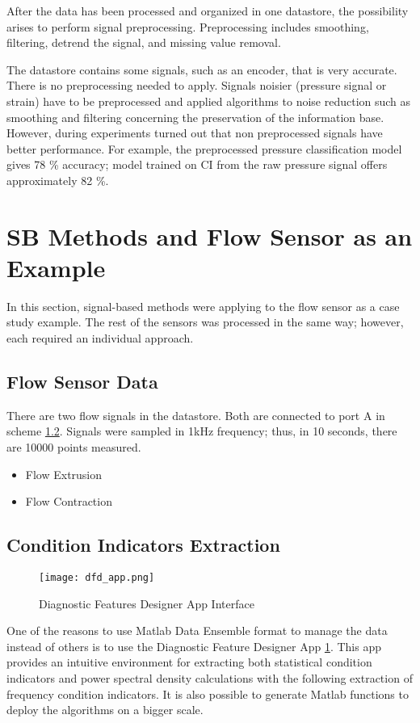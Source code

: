 After the data has been processed and organized in one datastore, the
possibility arises to perform signal preprocessing.  Preprocessing includes
smoothing, filtering, detrend the signal, and missing value removal.

The datastore contains some signals, such as an encoder, that is very
accurate. There is no preprocessing needed to apply. Signals noisier
(pressure signal or strain) have to be preprocessed and applied algorithms
to noise reduction such as smoothing and filtering concerning the
preservation of the information base. However, during experiments turned
out that non preprocessed signals have better performance. For example, the
preprocessed pressure classification model gives 78 \% accuracy; model
trained on CI from the raw pressure signal offers approximately 82 \%.

\section{SB Methods and Flow Sensor as an Example}
In this section, signal-based methods were applying to the flow sensor as a
case study example.  The rest of the sensors was processed in the same way;
however, each required an individual approach.

\subsection{Flow Sensor Data}
There are two flow signals in the datastore. Both are connected to port A
in scheme \ref{}. Signals were sampled in 1kHz frequency; thus, in 10
seconds, there are 10000 points measured. 

\begin{itemize}
    \item Flow Extrusion
    \item Flow Contraction
\end{itemize}

\subsection{Condition Indicators Extraction}

\begin{figure}[h!]
    \centering
    \texttt{[image: dfd\_app.png]}
    \caption{Diagnostic Features Designer App Interface}
    \label{fig:dfd_app}
\end{figure}

One of the reasons to use Matlab Data Ensemble format to manage the data
instead of others is to use the Diagnostic Feature Designer App
\ref{fig:dfd_app}.
This app provides an intuitive environment for extracting both statistical
condition indicators and power spectral density calculations with the
following extraction of frequency condition indicators. It is also possible
to generate Matlab functions to deploy the algorithms on a bigger scale.

